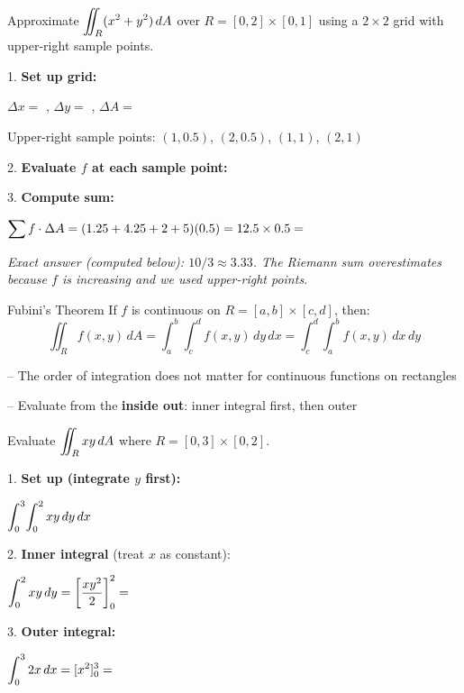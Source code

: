 \documentclass[11pt]{article}
\begin{document}
\begin{example}
Approximate $\displaystyle\iint_R (x^2 + y^2)\,dA$ over $R = [0,2]\times[0,1]$ using a $2\times 2$ grid with upper-right sample points.

1. \textbf{Set up grid:}

$\Delta x = $ , \quad $\Delta y = $ , \quad $\Delta A = $ 

Upper-right sample points: $(1, 0.5)$, $(2, 0.5)$, $(1, 1)$, $(2, 1)$

2. \textbf{Evaluate $f$ at each sample point:}


3. \textbf{Compute sum:}

$\displaystyle\sum f \cdot \Delta A = (1.25 + 4.25 + 2 + 5)(0.5) = 12.5 \times 0.5 = $ 

\medskip
\textit{Exact answer (computed below): $10/3 \approx 3.33$. The Riemann sum overestimates because $f$ is increasing and we used upper-right points.}
\end{example}


\begin{thmbox}{Fubini's Theorem}
If $f$ is continuous on $R = [a,b]\times[c,d]$, then:
\[\iint_R f(x,y)\,dA = \int_a^b\!\int_c^d f(x,y)\,dy\,dx = \int_c^d\!\int_a^b f(x,y)\,dx\,dy\]

-- The order of integration does not matter for continuous functions on rectangles

-- Evaluate from the \textbf{inside out}: inner integral first, then outer
\end{thmbox}

\begin{example}
Evaluate $\displaystyle\iint_R xy\,dA$ where $R = [0,3]\times[0,2]$.

1. \textbf{Set up (integrate $y$ first):}

$\displaystyle\int_0^3\!\int_0^2 xy\,dy\,dx$

2. \textbf{Inner integral} (treat $x$ as constant):

$\displaystyle\int_0^2 xy\,dy = \left[\frac{xy^2}{2}\right]_0^2 = $ 

3. \textbf{Outer integral:}

$\displaystyle\int_0^3 2x\,dx = [x^2]_0^3 = $ 
\end{example}
\end{document}
